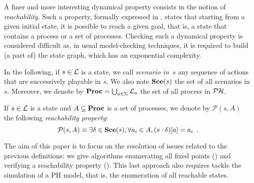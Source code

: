 A finer and more interesting dynamical property consists in
the notion of \emph{reachability}.
Such a property, formally expressed in ,
states that starting from a given initial state, it is possible
to reach a given goal, that is, a state that contains a process
or a set of processes.
Checking such a dynamical property is considered difficult
as, in usual model-checking techniques,
it is required to build (a part of) the state graph,
which has an exponential complexity.

In the following, if $s \in \mathcal{L}$ is a state,
we call \emph{scenario in~$s$}
any sequence of actions that are successively playable in $s$.
We also note $\mathbf{Sce}(s)$ the set of all scenarios in $s$.
Moreover, we denote by $\mathbf{Proc} = \bigcup_{a \in \Sigma} \mathcal{L}_a$
the set of all process in $\mathcal{PH}$.

\begin{definition}
\label{def:reachability}
  If $s \in \mathcal{L}$ is a state and $A \subseteq \mathbf{Proc}$ is a set of processes,
  we denote by $\mathcal{P}(s, A)$ the following \emph{reachability property}:
  \[\mathcal{P}(s, A) \equiv \exists \delta \in \mathbf{Sce}(s), \forall a_i \in A, {(s \cdot \delta)[a]} = a_i
    \enspace.\]
\end{definition}

The aim of this paper is to focus on the resolution of issues related to the previous definitions:
we give algorithms enumerating all fixed points ()
and verifying a reachability property ().
This last approach also requires tackle the simulation of a PH model, that is, the enumeration of all reachable states.
